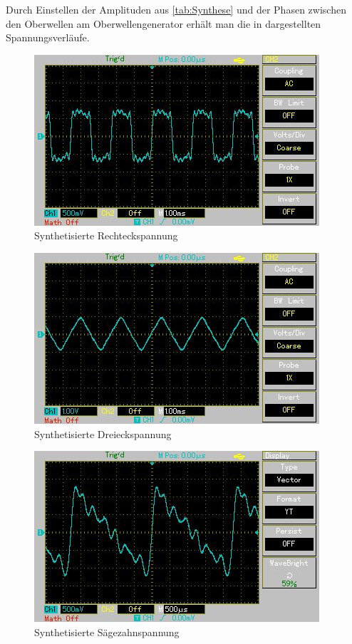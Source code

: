   

Durch Einstellen der Amplituden aus \cref{tab:Synthese} und der Phasen zwischen den Oberwellen am Oberwellengenerator
erhält man die in  dargestellten Spannungsverläufe.

\begin{figure}[h!]
	\centering
	\includegraphics[scale=0.8]{Grafiken/Rechteckspannung.jpg}
	\caption{Synthetisierte Rechteckspannung}
	\label{fig:Recht}
\end{figure}

\begin{figure}[h!]
	\centering
	\includegraphics[scale=0.8]{Grafiken/Dreieckspannung.jpg}
	\caption{Synthetisierte Dreieckspannung}
	\label{fig:Drei}
\end{figure}

\begin{figure}[h!]
	\centering
	\includegraphics[scale=0.8]{Grafiken/Saegezahnspannung.jpg}
	\caption{Synthetisierte Sägezahnspannung}	
	\label{fig:Säge}
\end{figure}
\hspace*{4cm}